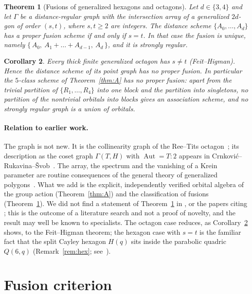 \documentclass[11pt]{article}
\newtheorem{theorem}{Theorem}
\newtheorem{corollary}[theorem]{Corollary}
\theoremstyle{remark}
\DeclareMathOperator{\Aut}{Aut}
\begin{document}
\begin{theorem}[Fusions of generalized hexagons and octagons]\label{thm:B}
Let $d\in\{3,4\}$ and let $\Gamma$ be a distance-regular graph with the intersection array of a generalized $2d$-gon of order $(s,t)$, where $s,t\ge2$ are integers. The distance scheme $\{A_0,\dots,A_d\}$ has a proper fusion scheme if and only if $s=t$. In that case the fusion is unique, namely $\{\,A_0,\ A_1+\dots+A_{d-1},\ A_d\,\}$, and it is strongly regular.
\end{theorem}

\begin{corollary}\label{cor:C}
Every thick finite generalized octagon has $s\neq t$ (Feit--Higman). Hence the distance scheme of its point graph has no proper fusion. In particular the $5$-class scheme of Theorem~\ref{thm:A} has no proper fusion: apart from the trivial partition of $\{R_1,\dots,R_4\}$ into one block and the partition into singletons, no partition of the nontrivial orbitals into blocks gives an association scheme, and no strongly regular graph is a union of orbitals.
\end{corollary}

\paragraph{Relation to earlier work.}
The graph is not new. It is the collinearity graph of the Ree--Tits octagon~\cite{Tits83}; its description as the coset graph $\Gamma(T,H)$ with $\Aut=T{:}2$ appears in Crnkovi\'c--Rukavina--\v{S}vob~\cite[Thm.~9, Table~13]{CRS}. The array, the spectrum and the vanishing of a Krein parameter are routine consequences of the general theory of generalized polygons~\cite{BCN,CGS}. What we add is the explicit, independently verified orbital algebra of the group action (Theorem~\ref{thm:A}) and the classification of fusions (Theorem~\ref{thm:B}). We did not find a statement of Theorem~\ref{thm:B} in \cite{CRS}, \cite{BCN} or the papers citing \cite{CRS}; this is the outcome of a literature search and not a proof of novelty, and the result may well be known to specialists. The octagon case reduces, as Corollary~\ref{cor:C} shows, to the Feit--Higman theorem; the hexagon case with $s=t$ is the familiar fact that the split Cayley hexagon $H(q)$ sits inside the parabolic quadric $Q(6,q)$ (Remark~\ref{rem:hex}; see~\cite{VM}).

\section{Fusion criterion}
\end{document}
